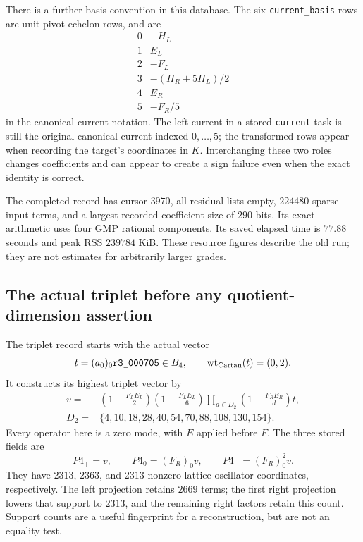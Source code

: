 There is a further basis convention in this database. The six
\texttt{current\_basis} rows are unit-pivot echelon rows, and are
\[
\begin{array}{c|l}
0&-H_L\\
1&E_L\\
2&-F_L\\
3&-(H_R+5H_L)/2\\
4&E_R\\
5&-F_R/5
\end{array}
\]
in the canonical current notation. The left current in a stored
\texttt{current} task is still the original canonical current indexed
$0,\ldots,5$; the transformed rows appear when recording the target's
coordinates in $K$. Interchanging these two roles changes coefficients
and can appear to create a sign failure even when the exact identity
is correct.

The completed record has cursor $3970$, all residual lists empty,
$224480$ sparse input terms, and a largest recorded coefficient size
of $290$ bits. Its exact arithmetic uses four GMP rational components.
Its saved elapsed time is $77.88$ seconds and peak RSS $239784$ KiB.
These resource figures describe the old run; they are not estimates for
arbitrarily larger grades.

\subsection{The actual triplet before any quotient-dimension assertion}
\label{expfinite:actual-triplet}

The triplet record
starts with the actual vector
\[
 t=(a_0)_0\texttt{r3\_000705}\in B_4,
 \qquad \operatorname{wt}_{\rm Cartan}(t)=(0,2).
\]
It constructs its highest triplet vector by
\begin{align*}
 v={}&\left(1-\frac{F_LE_L}{2}\right)
       \left(1-\frac{F_LE_L}{6}\right)
       \prod_{d\in D_2}\left(1-\frac{F_RE_R}{d}\right)t,\\
 D_2={}&\{4,10,18,28,40,54,70,88,108,130,154\}.
\end{align*}
Every operator here is a zero mode, with $E$ applied before $F$.
The three stored fields are
\[
 P4_{+}=v,\qquad P4_0=(F_R)_0v,\qquad
 P4_{-}=(F_R)_0^2v.
\]
They have $2313$, $2363$, and $2313$ nonzero lattice-oscillator
coordinates, respectively. The left projection retains $2669$ terms;
the first right projection lowers that support to $2313$, and the
remaining right factors retain this count. Support counts are a useful
fingerprint for a reconstruction, but are not an equality test.

